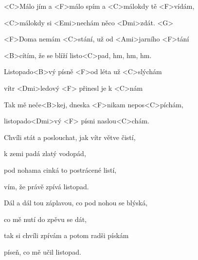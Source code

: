 

\zs
<C>Málo jím a <F>málo spím a <C>málokdy tě <F>vídám, 

<C>málokdy si <Emi>nechám něco <Dmi>zdát. <G> 

<F>Doma nemám <C>stání, už od <Ami>jarního <F>tání 

<B>cítím, že se blíží listo<C>pad, hm, hm, hm.
\ks

\zr
Listopado<B>vý písně <F>od léta už <C>slýchám 

vítr <Dmi>ledový <F> přinesl je k <C>nám 

Tak mě neče<B>kej, dneska <F>nikam nepos<C>píchám,

listopado<Dmi>vý <F> písni naslou<C>chám.
\kr

\zs
Chvíli stát a poslouchat, jak vítr větve čistí,

k zemi padá zlatý vodopád,

pod nohama cinká to postrácené listí,

vím, že právě zpívá listopad.
\ks

\zr

\kr

\zs
Dál a dál tou záplavou, co pod nohou se blýská,

co mě nutí do zpěvu se dát,

tak si chvíli zpívám a potom radši pískám

píseň, co mě učil listopad.
\ks

\zr
\kr

\kp
